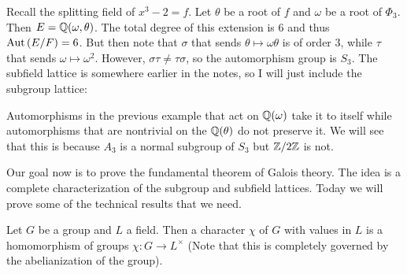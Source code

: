 \documentclass[10pt, twoside]{article}
\begin{document}
    \begin{exm}
        Recall the splitting field of $x^3-2 = f$. Let $\theta$ be a root of $f$ and $\omega$ be a root of $\Phi_3$. Then $E = \mathbb{Q}(\omega, \theta)$. The total degree of this extension is $6$ and thus $\operatorname{Aut}{(E/F)} = 6$. But then note that $\sigma$ that sends $\theta \mapsto \omega\theta$ is of order $3$, while $\tau$ that sends $\omega \mapsto \omega^2$. However, $\sigma\tau \neq \tau\sigma$, so the automorphism group is $S_3$. The subfield lattice is somewhere earlier in the notes, so I will just include the subgroup lattice:
        \begin{center}
        \end{center}
    \end{exm}

    \begin{rmk}
        Automorphisms in the previous example that act on $\mathbb{Q}(\omega)$ take it to itself while automorphisms that are nontrivial on the $\mathbb{Q}(\theta)$ do not preserve it. We will see that this is because $A_3$ is a normal subgroup of $S_3$ but $\mathbb{Z}/2\mathbb{Z}$ is not.
    \end{rmk}

    Our goal now is to prove the fundamental theorem of Galois theory. The idea is a complete characterization of the subgroup and subfield lattices. Today we will prove some of the technical results that we need.

    \begin{defn}[Character]
        Let $G$ be a group and $L$ a field. Then a character $\chi$ of $G$ with values in $L$ is a homomorphism of groups $\chi: G \rightarrow L^{\times}$ (Note that this is completely governed by the abelianization of the group).
    \end{defn}
\end{document}
